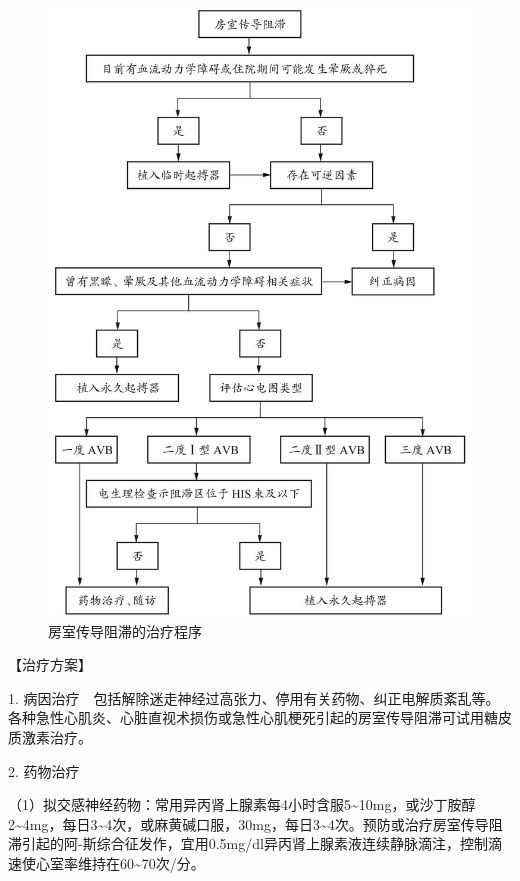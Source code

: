 \begin{figure}[!htbp]
 \centering
 \includegraphics{./images/Image00068.jpg}
 \captionsetup{justification=centering}
 \caption{房室传导阻滞的治疗程序}
 \label{fig2-2-23}
  \end{figure} 

【治疗方案】

1.
病因治疗　包括解除迷走神经过高张力、停用有关药物、纠正电解质紊乱等。各种急性心肌炎、心脏直视术损伤或急性心肌梗死引起的房室传导阻滞可试用糖皮质激素治疗。

2. 药物治疗

（1）拟交感神经药物：常用异丙肾上腺素每4小时含服5\textasciitilde{}10mg，或沙丁胺醇2\textasciitilde{}4mg，每日3\textasciitilde{}4次，或麻黄碱口服，30mg，每日3\textasciitilde{}4次。预防或治疗房室传导阻滞引起的阿-斯综合征发作，宜用0.5mg/dl异丙肾上腺素液连续静脉滴注，控制滴速使心室率维持在60\textasciitilde{}70次/分。

